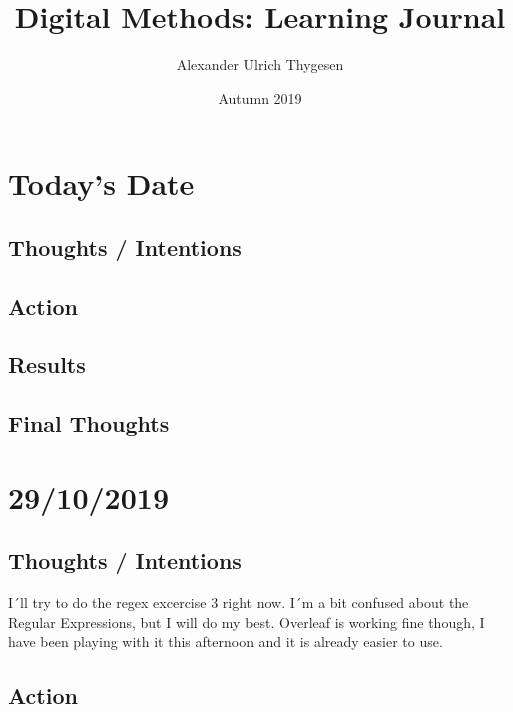 \documentclass{article}
\title{Digital Methods: Learning Journal}
\author{Alexander Ulrich Thygesen}
\date{Autumn 2019}
\begin{document}
\maketitle

\section{Today's Date}
\subsection{Thoughts / Intentions}
\subsection{Action}
\subsection{Results}
\subsection{Final Thoughts}

\pagebreak{}

\section{29/10/2019}
\subsection{Thoughts / Intentions}

\text I´ll try to do the regex excercise 3 right now. I´m a bit confused about the Regular Expressions, but I will do my best. Overleaf is working fine though, I have been playing with it this afternoon and it is already easier to use. 




\subsection{Action}
\end{document}
